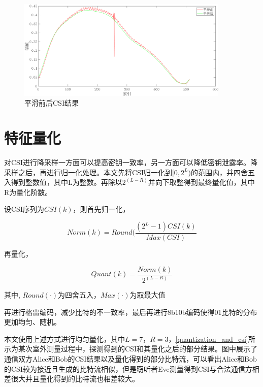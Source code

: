 \documentclass[master]{seuthesis} %
\begin{document}
\begin{Main}
\begin{figure}[htbp!]
    \centering \includegraphics[width=0.9\textwidth]{images/ma_before_after_res} 
    \caption{平滑前后CSI结果}
    \label{ma_before_after_res}
\end{figure}

\section{特征量化}

对CSI进行降采样一方面可以提高密钥一致率，另一方面可以降低密钥泄露率。降采样之后，再进行归一化处理。本文先将CSI归一化到$[0, 2^L)$的范围内，并四舍五入得到整数值，其中L为整数。再除以$2^{(L - R)}$并向下取整得到最终量化值，其中R为量化阶数。

设CSI序列为$CSI(k)$，则首先归一化，

\begin{equation}
    Norm(k) = Round(\frac{(2^L - 1) CSI(k)}{Max(CSI)}
\end{equation}

再量化，

\begin{equation}
    Quant(k) = \frac{Norm(k)}{2^{(L - R)}}
\end{equation}

其中, $Round(\cdot)$为四舍五入，$Max(\cdot)$为取最大值

再进行格雷编码，减少比特的不一致率，最后再进行8b10b编码使得01比特的分布更加均匀、随机。

本文使用上述方式进行均匀量化，其中$L = 7$，$R = 3$，\ref{quantization_and_csi}所示为某次室外测量过程中，探测得到的CSI和其量化之后的部分结果。图中展示了通信双方Alice和Bob的CSI结果以及量化得到的部分比特流，可以看出Alice和Bob的CSI较为接近且生成的比特流相似，但是窃听者Eve测量得到CSI与合法通信方相差很大并且量化得到的比特流也相差较大。


\end{Main}
\end{document}
